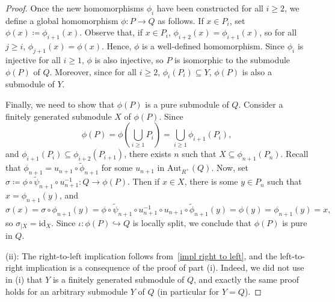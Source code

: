 \documentclass[11pt]{amsart}
\numberwithin{equation}{section}
\theoremstyle{definition}
\theoremstyle{plain}
\theoremstyle{definition}
\begin{document}
\begin{proof}
Once the new homomorphisms $\phi_i$ have been constructed for all $i \geq 2$, we define a global homomorphism $\phi \colon P \rightarrow Q$ as follows. If $x \in P_i$, set $\phi(x) \coloneqq \phi_{i+1}(x)$. Observe that, if $x \in P_i$, $\phi_{i+2}(x) = \phi_{i+1}(x)$, so for all $j \geq i$, $\phi_{j+1}(x) = \phi(x)$. Hence, $\phi$ is a well-defined homomorphism. Since $\phi_i$ is injective for all $i \geq 1$, $\phi$ is also injective, so $P$ is isomorphic to the submodule $\phi(P)$ of $Q$. Moreover, since for all $i \geq 2$, $\phi_i(P_i)  \subseteq Y$, $\phi(P)$ is also a submodule of $Y$. 

Finally, we need to show that $\phi(P)$ is a pure submodule of $Q$. Consider a finitely generated submodule $X$ of $\phi(P)$. Since
\begin{equation*}
    \phi(P) = \phi\left(\bigcup_{i\geq1} P_i\right) =  \bigcup_{i\geq 1} \phi_{i+1}(P_i),
\end{equation*}
and $\phi_{i+1}(P_i) \subseteq\phi_{i+2}(P_{i+1})$, there exists $n$ such that $X \subseteq \phi_{n+1}(P_n)$. Recall that $\phi_{n+1} = u_{n+1} \circ \tilde{\phi}_{n+1}$ for some $u_{n+1}$ in $\mathrm{Aut}_{R^+}(Q)$. Now, set $\sigma \coloneqq \phi \circ \tilde{\psi}_{n+1}\circ u_{n+1}^{-1} \colon Q \rightarrow \phi(P)$. Then if $x \in X$, there is some $y \in P_n$ such that $x = \phi_{n+1}(y)$, and
\begin{equation*}
    \sigma(x) = \sigma\circ\phi_{n+1}(y) = \phi \circ \tilde{\psi}_{n+1}\circ u_{n+1}^{-1} \circ u_{n+1} \circ \tilde{\phi}_{n+1} (y) = \phi(y) = \phi_{n+1}(y) = x,
\end{equation*}
so $\sigma_{|X} = \mathrm{id}_{X}$. Since $\iota \colon \phi(P) \hookrightarrow Q$ is locally split, we conclude that $\phi(P)$ is pure in $Q$.

(ii): The right-to-left implication follows from~\autoref{impl right to left}, and the left-to-right implication is a consequence of the proof of part (i). Indeed, we did not use in (i) that $Y$ is a finitely generated submodule of $Q$, and exactly the same proof holds for an arbitrary submodule $Y$ of $Q$ (in particular for $Y=Q$). 


\end{proof}
\end{document}
